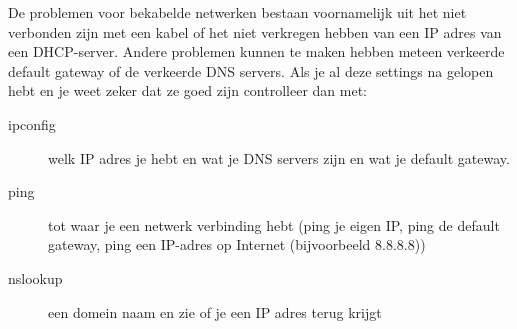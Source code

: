 De problemen voor bekabelde netwerken bestaan voornamelijk uit het niet verbonden zijn met een kabel of het niet verkregen hebben van een IP adres van een DHCP-server. Andere problemen kunnen te maken hebben meteen verkeerde default gateway of de verkeerde DNS servers. Als je al deze settings na gelopen hebt en je weet zeker dat ze goed zijn controlleer dan met:
\begin{description}
\item[ipconfig] welk IP adres je hebt en wat je DNS servers zijn en wat je default gateway.
\item[ping] tot waar je een netwerk verbinding hebt (ping je eigen IP, ping de default gateway, ping een IP-adres op Internet (bijvoorbeeld 8.8.8.8))
\item[nslookup] een domein naam en zie of je een IP adres terug krijgt
\end{description}

